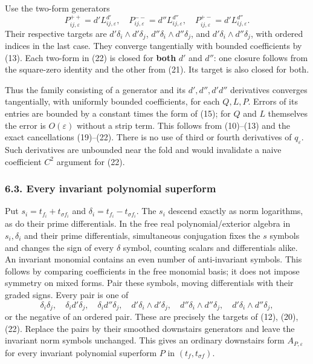 \documentclass[
  11pt,
]{article}
\begin{document}
Use the two-form generators \[
 P_{ij,\varepsilon}^{++}=d'L_{ij,\varepsilon}^{d'},\quad
 P_{ij,\varepsilon}^{--}=d''L_{ij,\varepsilon}^{d''},\quad
 P_{ij,\varepsilon}^{+-}=d'L_{ij,\varepsilon}^{d''}.          \tag{22}
\] Their respective targets are \(d'\delta_i\wedge d'\delta_j\),
\(d''\delta_i\wedge d''\delta_j\), and \(d'\delta_i\wedge d''\delta_j\),
with ordered indices in the last case. They converge tangentially with
bounded coefficients by (13). Each two-form in (22) is closed for
\textbf{both} \(d'\) and \(d''\): one closure follows from the
square-zero identity and the other from (21). Its target is also closed
for both.

Thus the family consisting of a generator and its \(d',d'',d'd''\)
derivatives converges tangentially, with uniformly bounded coefficients,
for each \(Q,L,P\). Errors of its entries are bounded by a constant
times the form of (15); for \(Q\) and \(L\) themselves the error is
\(O(\varepsilon)\) without a strip term. This follows from (10)--(13)
and the exact cancellations (19)--(22). There is no use of third or
fourth derivatives of \(q_\varepsilon\). Such derivatives are unbounded
near the fold and would invalidate a naive coefficient \(C^2\) argument
for (22).

\subsubsection{6.3. Every invariant polynomial
superform}\label{every-invariant-polynomial-superform}

Put \(s_i=t_{f_i}+t_{\sigma f_i}\) and
\(\delta_i=t_{f_i}-t_{\sigma f_i}\). The \(s_i\) descend exactly as norm
logarithms, as do their prime differentials. In the free real
polynomial/exterior algebra in \(s_i,\delta_i\) and their prime
differentials, simultaneous conjugation fixes the \(s\) symbols and
changes the sign of every \(\delta\) symbol, counting scalars and
differentials alike. An invariant monomial contains an even number of
anti-invariant symbols. This follows by comparing coefficients in the
free monomial basis; it does not impose symmetry on mixed forms. Pair
these symbols, moving differentials with their graded signs. Every pair
is one of \[
 \delta_i\delta_j,\quad \delta_i d'\delta_j,\quad
 \delta_i d''\delta_j,\quad
 d'\delta_i\wedge d'\delta_j,\quad
 d''\delta_i\wedge d''\delta_j,\quad
 d'\delta_i\wedge d''\delta_j,
\] or the negative of an ordered pair. These are precisely the targets
of (12), (20), (22). Replace the pairs by their smoothed downstairs
generators and leave the invariant norm symbols unchanged. This gives an
ordinary downstairs form \(A_{P,\varepsilon}\) for every invariant
polynomial superform \(P\) in \((t_f,t_{\sigma f})\).
\end{document}
